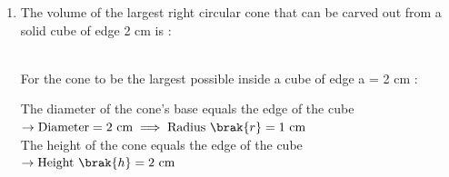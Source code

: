 \begin{enumerate}[label=\thesubsection.\arabic*, ref=\thesubsection.\theenumi]
\\Surface Area of Two Hemispheres:
\\When a solid sphere is cut into two hemispheres, each hemisphere gets a new flat circular base.
\\The total surface area of one solid hemisphere = $3\pi r^2$.
\\Therefore, the total surface area of two hemispheres taken together is:
\begin{align}
\text{Surface\ Area\ of\ Two\ Hemispheres }= 2\times3\pi r^2 = 6\pi r^2
\end{align}
\\Finding the ratio:
\begin{align}\frac{\text{Surface\ area\ of\ sphere}}{\text{Surface\ Area\ of\ Two\ Hemispheres}} = \frac{4\pi r^2}{6\pi r^2} = \frac{2}{3}
\end{align}

\item
The volume of the largest right circular cone that can be carved out from a solid cube of edge 2 cm is :
\begin{enumerate}
\end{enumerate}
\solution
\\For the cone to be the largest possible inside a cube of edge a = 2 cm :

The diameter of the cone's base equals the edge of the cube
\\ \(\rightarrow \text{Diameter} = 2\text{ cm} \implies \text{Radius } \brak{r} = 1\text{ cm}\)
\\The height of the cone equals the edge of the cube \(\rightarrow \text{Height } \brak{h} = 2\text{ cm}\)


\end{enumerate}
